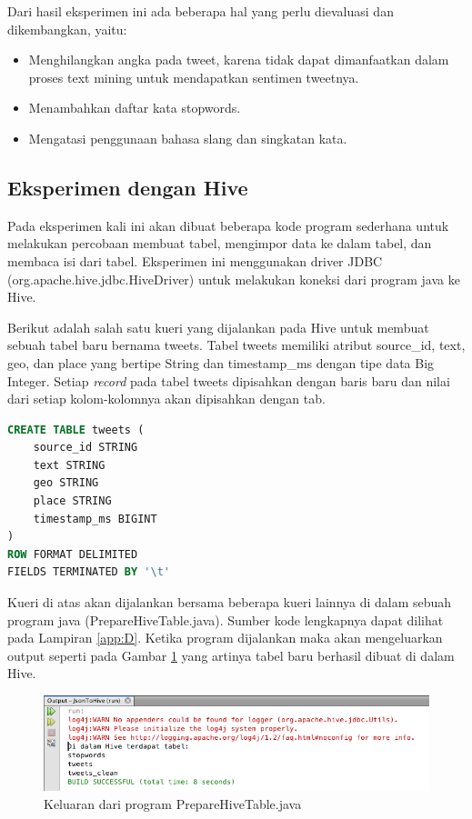   
Dari hasil eksperimen ini ada beberapa hal yang perlu dievaluasi dan dikembangkan, yaitu:
\begin{itemize}
	\item Menghilangkan angka pada tweet, karena tidak dapat dimanfaatkan dalam proses text mining untuk mendapatkan sentimen tweetnya.
	\item Menambahkan daftar kata stopwords.
	\item Mengatasi penggunaan bahasa slang dan singkatan kata.
\end{itemize}

\subsection{Eksperimen dengan Hive}
\label{sec:eksperimen-hive}
Pada eksperimen kali ini akan dibuat beberapa kode program sederhana untuk melakukan percobaan membuat tabel, mengimpor data ke dalam tabel, dan membaca isi dari tabel. Eksperimen ini menggunakan driver JDBC (org.apache.hive.jdbc.HiveDriver) untuk melakukan koneksi dari program java ke Hive. 

Berikut adalah salah satu kueri yang dijalankan pada Hive untuk membuat sebuah tabel baru bernama tweets. Tabel tweets memiliki atribut source\_id, text, geo, dan place yang bertipe String dan timestamp\_ms dengan tipe data Big Integer. Setiap \textit{record} pada tabel tweets dipisahkan dengan baris baru dan nilai dari setiap kolom-kolomnya akan dipisahkan dengan tab.

\begin{lstlisting}[language=sql,basicstyle=\small,caption=Kueri Hive untuk Membuat Tabel tweets]
CREATE TABLE tweets (
    source_id STRING
    text STRING
    geo STRING
    place STRING
    timestamp_ms BIGINT
) 
ROW FORMAT DELIMITED 
FIELDS TERMINATED BY '\t'
\end{lstlisting}

Kueri di atas akan dijalankan bersama beberapa kueri lainnya di dalam sebuah program java (PrepareHiveTable.java). Sumber kode lengkapnya dapat dilihat pada Lampiran \ref{app:D}. Ketika program dijalankan maka akan mengeluarkan output seperti pada Gambar \ref{fig:output-preparetable-hive} yang artinya tabel baru berhasil dibuat di dalam Hive. 

\begin{figure}
	\centering
	\includegraphics[scale=0.5]{Gambar/output-preparetable-hive.png}
	\caption[Keluaran dari program PrepareHiveTable.java]{Keluaran dari program PrepareHiveTable.java}
	\label{fig:output-preparetable-hive}
\end{figure}

